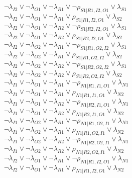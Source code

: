 $\neg\lambda_{I2} \vee \neg\lambda_{O1} \vee \neg\lambda_{R1} \vee \neg\rho_{S1|R1,I2,O1} \vee \lambda_{S1}$\\
$\neg\lambda_{I2} \vee \neg\lambda_{O1} \vee \neg\lambda_{R1} \vee \rho_{S1|R1,I2,O1} \vee \lambda_{S2}$\\
$\neg\lambda_{I2} \vee \neg\lambda_{O1} \vee \neg\lambda_{R2} \vee \neg\rho_{S1|R2,I2,O1} \vee \lambda_{S1}$\\
$\neg\lambda_{I2} \vee \neg\lambda_{O1} \vee \neg\lambda_{R2} \vee \rho_{S1|R2,I2,O1} \vee \lambda_{S2}$\\
$\neg\lambda_{I2} \vee \neg\lambda_{O2} \vee \neg\lambda_{R1} \vee \neg\rho_{S1|R1,O2,I2} \vee \lambda_{S1}$\\
$\neg\lambda_{I2} \vee \neg\lambda_{O2} \vee \neg\lambda_{R1} \vee \rho_{S1|R1,O2,I2} \vee \lambda_{S2}$\\
$\neg\lambda_{I2} \vee \neg\lambda_{O2} \vee \neg\lambda_{R2} \vee \neg\rho_{S1|R2,O2,I2} \vee \lambda_{S1}$\\
$\neg\lambda_{I2} \vee \neg\lambda_{O2} \vee \neg\lambda_{R2} \vee \rho_{S1|R2,O2,I2} \vee \lambda_{S2}$\\
$\neg\lambda_{I1} \vee \neg\lambda_{O1} \vee \neg\lambda_{R1} \vee \neg\rho_{N1|R1,I1,O1} \vee \lambda_{N1}$\\
$\neg\lambda_{I1} \vee \neg\lambda_{O1} \vee \neg\lambda_{R1} \vee \rho_{N1|R1,I1,O1} \vee \lambda_{N2}$\\
$\neg\lambda_{I1} \vee \neg\lambda_{O1} \vee \neg\lambda_{R2} \vee \neg\rho_{N1|R2,I1,O1} \vee \lambda_{N1}$\\
$\neg\lambda_{I1} \vee \neg\lambda_{O1} \vee \neg\lambda_{R2} \vee \rho_{N1|R2,I1,O1} \vee \lambda_{N2}$\\
$\neg\lambda_{I1} \vee \neg\lambda_{O2} \vee \neg\lambda_{R1} \vee \neg\rho_{N1|R1,O2,I1} \vee \lambda_{N1}$\\
$\neg\lambda_{I1} \vee \neg\lambda_{O2} \vee \neg\lambda_{R1} \vee \rho_{N1|R1,O2,I1} \vee \lambda_{N2}$\\
$\neg\lambda_{I1} \vee \neg\lambda_{O2} \vee \neg\lambda_{R2} \vee \neg\rho_{N1|R2,O2,I1} \vee \lambda_{N1}$\\
$\neg\lambda_{I1} \vee \neg\lambda_{O2} \vee \neg\lambda_{R2} \vee \rho_{N1|R2,O2,I1} \vee \lambda_{N2}$\\
$\neg\lambda_{I2} \vee \neg\lambda_{O1} \vee \neg\lambda_{R1} \vee \neg\rho_{N1|R1,I2,O1} \vee \lambda_{N1}$\\
$\neg\lambda_{I2} \vee \neg\lambda_{O1} \vee \neg\lambda_{R1} \vee \rho_{N1|R1,I2,O1} \vee \lambda_{N2}$\\
